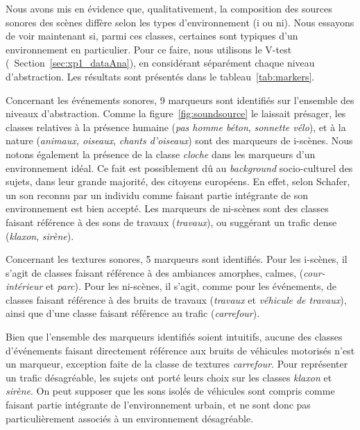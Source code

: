\documentclass[twoside,twocolumn]{article}
\begin{document}
Nous avons mis en évidence que, qualitativement, la composition des sources sonores des scènes diffère selon les types d'environnement (i ou ni). Nous essayons de voir maintenant si, parmi ces classes, certaines sont typiques d'un environnement en particulier. Pour ce faire, nous utilisons le V-test (\cf~Section~\ref{sec:xp1_dataAna}), en considérant séparément chaque niveau d'abstraction. Les résultats sont présentés dans le tableau~\ref{tab:markers}.

Concernant les événements sonores, 9 marqueurs sont identifiés sur l'ensemble des niveaux d'abstraction. Comme la figure~\ref{fig:soundsource} le laissait présager, les classes relatives à la présence humaine (\emph{pas homme béton}, \emph{sonnette vélo}), et à la nature (\emph{animaux, oiseaux}, \emph{chants d'oiseaux}) sont des marqueurs de i-scènes. Nous notons également la présence de la classe \emph{cloche} dans les marqueurs d'un environnement idéal. Ce fait est possiblement dû au \emph{background} socio-culturel des sujets, dans leur grande majorité, des citoyens européens. En effet, selon Schafer, un son reconnu par un individu comme faisant partie intégrante de son environnement est bien accepté. Les marqueurs de ni-scènes sont des classes faisant référence à des sons de travaux (\emph{travaux}), ou suggérant un trafic dense (\emph{klaxon}, \emph{sirène}).

Concernant les textures sonores, 5 marqueurs sont identifiés. Pour les i-scènes, il s'agit de classes faisant référence à des ambiances amorphes, calmes, (\emph{cour-intérieur} et \emph{parc}). Pour les ni-scènes, il s'agit, comme pour les événements, de classes faisant référence à des bruits de travaux (\emph{travaux} et \emph{véhicule de travaux}), ainsi que d'une classe faisant référence au trafic (\emph{carrefour}).

Bien que l'ensemble des marqueurs identifiés soient intuitifs, aucune des classes d'événements faisant directement référence aux bruits de véhicules motorisés n'est un marqueur, exception faite de la classe de textures \emph{carrefour}. Pour représenter un trafic désagréable, les sujets ont porté leurs choix sur les classes \emph{klaxon} et \emph{sirène}. On peut supposer que les sons isolés de véhicules sont compris comme faisant partie intégrante de l'environnement urbain, et ne sont donc pas particulièrement associés à un environnement désagréable.
\end{document}
